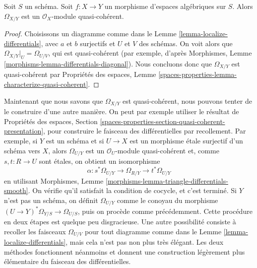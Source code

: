 \begin{lemma}
\label{lemma-module-differentials-quasi-coherent}
Soit $S$ un schéma. Soit $f : X \to Y$ un morphisme d'espaces algébriques
sur $S$. Alors $\Omega_{X/Y}$ est un $\mathcal{O}_X$-module quasi-cohérent.
\end{lemma}

\begin{proof}
Choisissons un diagramme comme dans le
Lemme \ref{lemma-localize-differentials},
avec $a$ et $b$ surjectifs et $U$ et $V$ des schémas.
On voit alors que $\Omega_{X/Y}|_U = \Omega_{U/V}$, qui est
quasi-cohérent (par exemple, d'après
Morphismes, Lemme \ref{morphisms-lemma-differentials-diagonal}).
Nous concluons donc que $\Omega_{X/Y}$ est quasi-cohérent par
Propriétés des espaces,
Lemme \ref{spaces-properties-lemma-characterize-quasi-coherent}.
\end{proof}

\begin{remark}
\label{remark-alternative}
Maintenant que nous savons que $\Omega_{X/Y}$ est quasi-cohérent, nous pouvons tenter
de le construire d'une autre manière. On peut par exemple utiliser le résultat de
Propriétés des espaces,
Section \ref{spaces-properties-section-quasi-coherent-presentation},
pour construire le faisceau des différentielles par recollement.
Par exemple, si $Y$ est un schéma et si $U \to X$ est un morphisme étale surjectif
d'un schéma vers $X$, alors $\Omega_{U/Y}$ est
un $\mathcal{O}_U$-module quasi-cohérent et, comme $s, t : R \to U$
sont étales, on obtient un isomorphisme
$$
\alpha : s^*\Omega_{U/Y} \to \Omega_{R/Y} \to t^*\Omega_{U/Y}
$$
en utilisant
Morphismes, Lemme \ref{morphisms-lemma-triangle-differentials-smooth}.
On vérifie qu'il satisfait la condition de cocycle, et c'est terminé.
Si $Y$ n'est pas un schéma, on définit $\Omega_{U/Y}$ comme le conoyau
du morphisme $(U \to Y)^*\Omega_{Y/S} \to \Omega_{U/S}$, puis on procède comme
précédemment. Cette procédure en deux étapes est quelque peu disgracieuse. Une autre possibilité
consiste à recoller les faisceaux $\Omega_{U/V}$ pour tout diagramme comme dans le
Lemme \ref{lemma-localize-differentials},
mais cela n'est pas non plus très élégant. Les deux méthodes fonctionnent néanmoins et
donnent une construction légèrement plus élémentaire du faisceau des
différentielles.
\end{remark}

